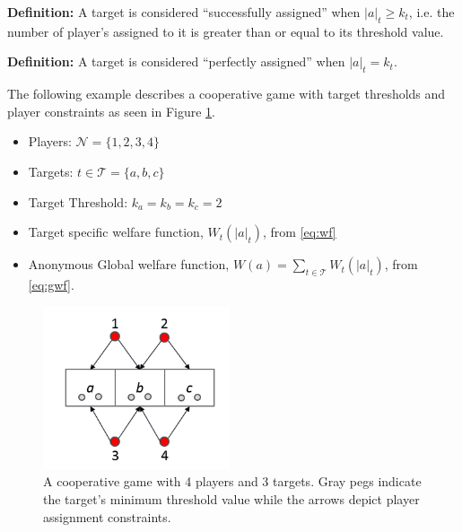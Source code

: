 \documentclass[11pt, onecolumn, compsoc, letterpaper]{article}
\newcommand{\Pl}{\mathcal{N}} %
\newcommand{\Ta}{\mathcal{T}} %
\begin{document}
\textbf{Definition:} A target is considered ``successfully assigned'' when $|a|_t \geq k_t$, i.e. the number of player's assigned to it is greater than or equal to its threshold value.

\textbf{Definition:} A target is considered ``perfectly assigned'' when $|a|_t = k_t$.

The following example describes a cooperative game with target thresholds and player constraints as seen in Figure \ref{fig:ex1}.
\begin{itemize}
	\item Players: $\Pl = \{1,2,3,4\}$
	\item Targets: $t \in \Ta = \{a, b, c\}$
	\item Target Threshold: $k_a = k_b = k_c = 2$
	\item Target specific welfare function, $W_t(|a|_t)$, from \eqref{eq:wf}
	\item Anonymous Global welfare function, $W(a) = \sum\limits_{t \in \Ta} W_t(|a|_t)$, from \eqref{eq:gwf}.
\end{itemize}
\begin{figure}[!htb]
	\centering\includegraphics[width=5.5cm]{assets/ex1.png}
	\centering\caption{A cooperative game with 4 players and 3 targets. Gray pegs indicate the target's minimum threshold value while the arrows depict player assignment constraints.}\label{fig:ex1}
\end{figure}
\end{document}
